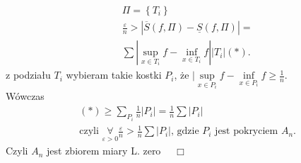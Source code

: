 \documentclass[../main.tex]{subfiles}
\begin{document}
\begin{dowod}
        \begin{align*}
            &\Pi = \left\{ T_i \right\}\\
            &\frac{\varepsilon}{n} > |\overline{S}(f,\Pi) - \underline{S}(f,\Pi)| = \\
            &\sum | \underset{x\in T_i}{\sup} f - \underset{x\in T_i}{\inf} f| |T_i|
            (*)
        .\end{align*}
        z podziału $T_i$ wybieram takie kostki $P_i$, że $|\underset{x\in P_i}{\sup} f - \underset{x\in P_i}{\inf} f \ge \frac{1}{n}$.\\
        Wówczas
        \begin{align*}
            &(*) \ge \sum_{P_i} \frac{1}{n} | P_i | = \frac{1}{n} \sum |P_i|\\
            &\text{czyli } \underset{\varepsilon>0}{\forall} \frac{\varepsilon}{n} > \frac{1}{n} \sum |P_i|\text{, gdzie $P_i$ jest pokryciem $A_n$}
        .\end{align*}
        Czyli $A_n$ jest zbiorem miary L. zero $\quad\Box$
    \end{dowod}
\end{document}
